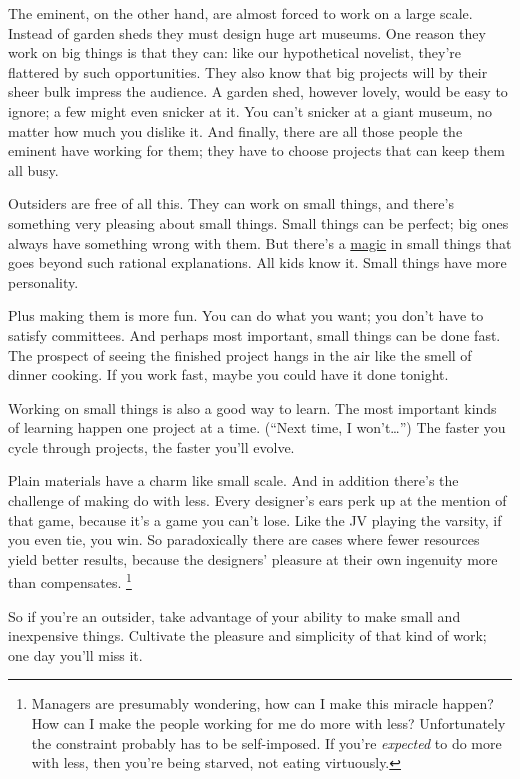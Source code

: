 \documentclass[12pt]{book}
\begin{document}
The eminent, on the other hand, are almost forced to work on a large
scale. Instead of garden sheds they must design huge art museums. One
reason they work on big things is that they can: like our hypothetical
novelist, they're flattered by such opportunities. They also know that
big projects will by their sheer bulk impress the audience. A garden
shed, however lovely, would be easy to ignore; a few might even snicker
at it. You can't snicker at a giant museum, no matter how much you
dislike it. And finally, there are all those people the eminent have
working for them; they have to choose projects that can keep them all
busy.

Outsiders are free of all this. They can work on small things, and
there's something very pleasing about small things. Small things can be
perfect; big ones always have something wrong with them. But there's a
\href{isetta.html}{magic} in small things that goes beyond such rational
explanations. All kids know it. Small things have more personality.

Plus making them is more fun. You can do what you want; you don't have
to satisfy committees. And perhaps most important, small things can be
done fast. The prospect of seeing the finished project hangs in the air
like the smell of dinner cooking. If you work fast, maybe you could have
it done tonight.

Working on small things is also a good way to learn. The most important
kinds of learning happen one project at a time. (``Next time, I
won't\ldots{}'') The faster you cycle through projects, the faster
you'll evolve.

Plain materials have a charm like small scale. And in addition there's
the challenge of making do with less. Every designer's ears perk up at
the mention of that game, because it's a game you can't lose. Like the
JV playing the varsity, if you even tie, you win. So paradoxically there
are cases where fewer resources yield better results, because the
designers' pleasure at their own ingenuity more than compensates.
\footnote{Managers are presumably wondering, how can I make this miracle
happen? How can I make the people working for me do more with less?
Unfortunately the constraint probably has to be self-imposed. If you're
\emph{expected} to do more with less, then you're being starved, not
eating virtuously.}

So if you're an outsider, take advantage of your ability to make small
and inexpensive things. Cultivate the pleasure and simplicity of that
kind of work; one day you'll miss it.
\end{document}
